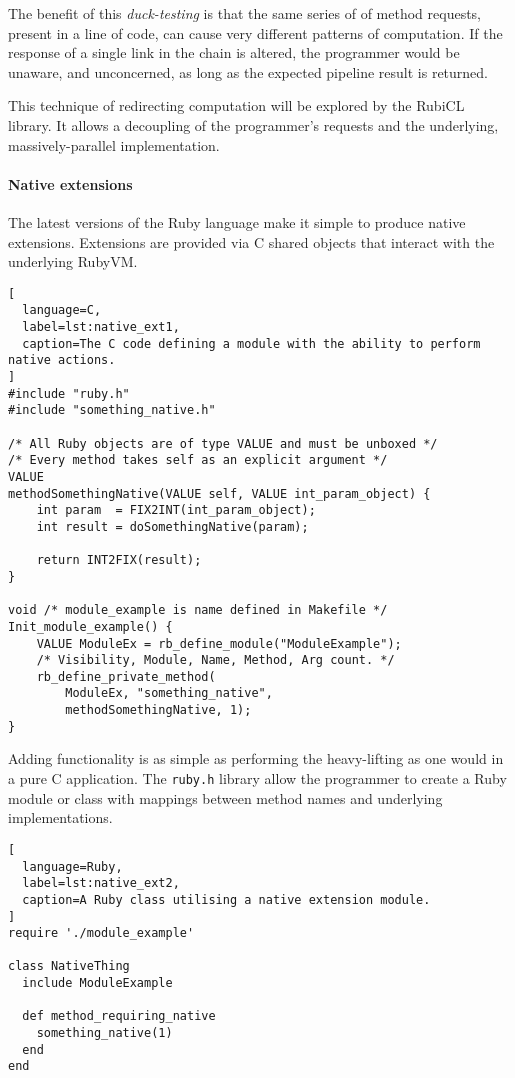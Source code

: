 The benefit of this \emph{duck-testing} is that the same series of of method requests, present in a line of code, can cause very different patterns of computation. If the response of a single link in the chain is altered, the programmer would be unaware, and unconcerned, as long as the expected pipeline result is returned.

This technique of redirecting computation will be explored by the RubiCL library. It allows a decoupling of the programmer's requests and the underlying, massively-parallel implementation.

\paragraph*{Native extensions}
The latest versions of the Ruby language make it simple to produce native extensions. Extensions are provided via C shared objects that interact with the underlying \ac{RubyVM}.

\begin{lstlisting}[
  language=C,
  label=lst:native_ext1,
  caption=The C code defining a module with the ability to perform native actions.
]
#include "ruby.h"
#include "something_native.h"

/* All Ruby objects are of type VALUE and must be unboxed */
/* Every method takes self as an explicit argument */
VALUE
methodSomethingNative(VALUE self, VALUE int_param_object) {
    int param  = FIX2INT(int_param_object);
    int result = doSomethingNative(param);

    return INT2FIX(result);
}

void /* module_example is name defined in Makefile */
Init_module_example() {
    VALUE ModuleEx = rb_define_module("ModuleExample");
    /* Visibility, Module, Name, Method, Arg count. */
    rb_define_private_method(
        ModuleEx, "something_native",
        methodSomethingNative, 1);
}
\end{lstlisting}

Adding functionality is as simple as performing the heavy-lifting as one would in a pure C application. The \verb|ruby.h| library allow the programmer to create a Ruby module or class with mappings between method names and underlying implementations.

\begin{lstlisting}[
  language=Ruby,
  label=lst:native_ext2,
  caption=A Ruby class utilising a native extension module.
]
require './module_example'

class NativeThing
  include ModuleExample

  def method_requiring_native
    something_native(1)
  end
end
\end{lstlisting}

